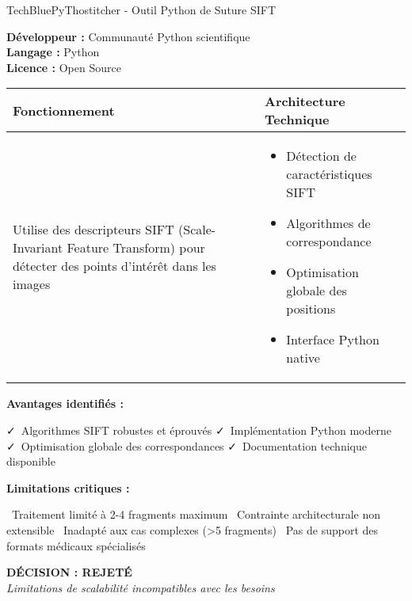 \documentclass[11pt,a4paper]{report}
\newcommand{\pro}[1]{\textcolor{SuccessGreen}{\faCheck\ #1}}
\newcommand{\con}[1]{\textcolor{DangerRed}{\faTimes\ #1}}
\begin{document}
\begin{techbox}{TechBlue}{PyThostitcher - Outil Python de Suture SIFT}

\textbf{Développeur :} Communauté Python scientifique \\
\textbf{Langage :} Python \\
\textbf{Licence :} Open Source

\vspace{0.5cm}

\begin{tabularx}{\textwidth}{|X|X|}
\hline
\rowcolor{LightGray}
\textbf{Fonctionnement} & \textbf{Architecture Technique} \\
\hline
Utilise des descripteurs SIFT (Scale-Invariant Feature Transform) pour détecter des points d'intérêt dans les images & 
\begin{itemize}[nosep]
\item Détection de caractéristiques SIFT
\item Algorithmes de correspondance
\item Optimisation globale des positions
\item Interface Python native
\end{itemize} \\
\hline
\end{tabularx}

\vspace{0.5cm}

\textbf{Avantages identifiés :}
\begin{itemize}[leftmargin=*]
    \pro{Algorithmes SIFT robustes et éprouvés}
    \pro{Implémentation Python moderne}
    \pro{Optimisation globale des correspondances}
    \pro{Documentation technique disponible}
\end{itemize}

\textbf{Limitations critiques :}
\begin{itemize}[leftmargin=*]
    \con{Traitement limité à 2-4 fragments maximum}
    \con{Contrainte architecturale non extensible}
    \con{Inadapté aux cas complexes (>5 fragments)}
    \con{Pas de support des formats médicaux spécialisés}
\end{itemize}

\begin{center}
\textbf{\textcolor{DangerRed}{DÉCISION : REJETÉ}}\\
\textit{Limitations de scalabilité incompatibles avec les besoins}
\end{center}

\end{techbox}
\end{document}
